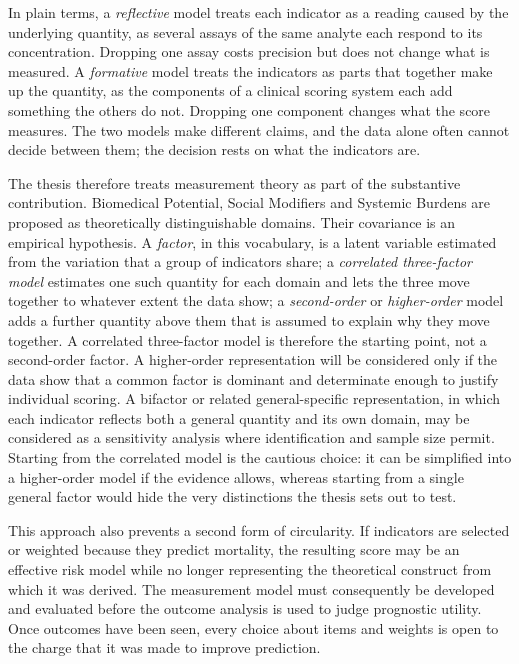 In plain terms, a \emph{reflective} model treats each indicator as a reading caused by the underlying quantity, as several assays of the same analyte each respond to its concentration. Dropping one assay costs precision but does not change what is measured. A \emph{formative} model treats the indicators as parts that together make up the quantity, as the components of a clinical scoring system each add something the others do not. Dropping one component changes what the score measures. The two models make different claims, and the data alone often cannot decide between them; the decision rests on what the indicators are.

The thesis therefore treats measurement theory as part of the substantive contribution. Biomedical Potential, Social Modifiers and Systemic Burdens are proposed as theoretically distinguishable domains. Their covariance is an empirical hypothesis. A \emph{factor}, in this vocabulary, is a latent variable estimated from the variation that a group of indicators share; a \emph{correlated three-factor model} estimates one such quantity for each domain and lets the three move together to whatever extent the data show; a \emph{second-order} or \emph{higher-order} model adds a further quantity above them that is assumed to explain why they move together. A correlated three-factor model is therefore the starting point, not a second-order factor. A higher-order representation will be considered only if the data show that a common factor is dominant and determinate enough to justify individual scoring. A bifactor or related general-specific representation, in which each indicator reflects both a general quantity and its own domain, may be considered as a sensitivity analysis where identification and sample size permit. Starting from the correlated model is the cautious choice: it can be simplified into a higher-order model if the evidence allows, whereas starting from a single general factor would hide the very distinctions the thesis sets out to test.

This approach also prevents a second form of circularity. If indicators are selected or weighted because they predict mortality, the resulting score may be an effective risk model while no longer representing the theoretical construct from which it was derived. The measurement model must consequently be developed and evaluated before the outcome analysis is used to judge prognostic utility. Once outcomes have been seen, every choice about items and weights is open to the charge that it was made to improve prediction.

